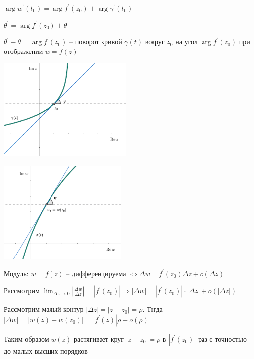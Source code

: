 \documentclass[12pt]{article}
\begin{document}
$\arg w^\prime(t_0) = \arg f^\prime (z_0) + \arg \gamma^\prime(t_0)$

$\theta^\prime = \arg f^\prime(z_0) + \theta$

$\theta^\prime - \theta = \arg f^\prime (z_0)$ -- поворот кривой $\gamma(t)$ вокруг $z_0$ на угол $\arg f^\prime(z_0)$ при отображении $w = f(z)$


\begin{multicols}{2}
    \begin{center}
        \includegraphics[height=5cm]{addchapters2/images/addchapters2_2025_03_21_1}

        \includegraphics[height=5cm]{addchapters2/images/addchapters2_2025_03_21_2}
    \end{center}
\end{multicols}

\mediumvspace

\underline{Модуль}: $w = f(z)$ -- дифференцируема $\Longleftrightarrow \Delta w = f^\prime(z_0) \Delta z + o(\Delta z)$

Рассмотрим $\lim_{\Delta z \to 0} \left|\frac{\Delta w}{\Delta z}\right| = |f^\prime(z_0)| \Longrightarrow |\Delta w| = |f^\prime(z_0)| \cdot |\Delta z| + o(|\Delta z|)$

Рассмотрим малый контур $|\Delta z| = |z - z_0| = \rho$. Тогда $|\Delta w| = |w(z) - w(z_0)| = |f^\prime(z)| \rho + o(\rho)$

Таким образом $w(z)$ растягивает круг $|z - z_0| = \rho$ в $|f^\prime(z_0)|$ раз с точностью до малых высших порядков
\end{document}
